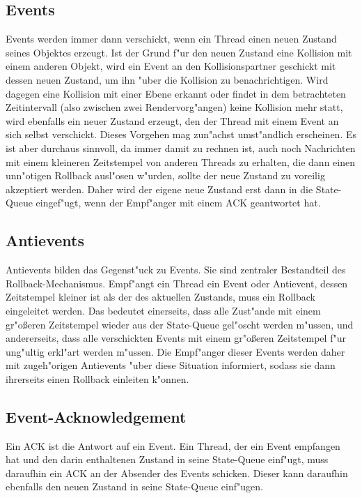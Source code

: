 \documentclass[a4paper, 10pt, openright, parskip, chapterprefix]{scrreprt}
\begin{document}
\subsection{Events}
Events werden immer dann verschickt, wenn ein Thread einen neuen Zustand seines Objektes erzeugt. Ist der Grund f"ur den
neuen Zustand eine Kollision mit einem anderen Objekt, wird ein Event an den Kollisionspartner geschickt mit dessen
neuen Zustand, um ihn "uber
die Kollision zu benachrichtigen. Wird dagegen eine Kollision mit einer Ebene erkannt oder findet in dem betrachteten
Zeitintervall (also zwischen zwei Rendervorg"angen) keine Kollision mehr statt, wird ebenfalls ein neuer Zustand
erzeugt, den der Thread mit einem Event an sich selbst verschickt. Dieses Vorgehen mag zun"achst umst"andlich erscheinen. Es ist aber
durchaus sinnvoll, da immer damit zu rechnen ist, auch noch Nachrichten mit einem kleineren Zeitstempel von anderen
Threads zu erhalten, die dann einen unn"otigen Rollback ausl"osen w"urden, sollte der neue Zustand zu voreilig akzeptiert
werden. Daher wird der eigene neue Zustand erst dann in die State-Queue eingef"ugt, wenn der Empf"anger mit einem ACK
geantwortet hat.

\subsection{Antievents}
Antievents bilden das Gegenst"uck zu Events. Sie sind zentraler Bestandteil des Rollback-Mechanismus. Empf"angt ein
Thread ein Event oder Antievent, dessen Zeitstempel kleiner ist als der des aktuellen Zustands, muss ein Rollback eingeleitet
werden. Das bedeutet einerseits, dass alle Zust"ande mit einem gr"o\ss eren Zeitstempel wieder aus der State-Queue gel"oscht werden m"ussen, und
andererseits, dass alle verschickten Events mit einem gr"o\ss eren Zeitstempel f"ur ung"ultig erkl"art werden m"ussen.
Die Empf"anger dieser Events werden daher mit
zugeh"origen Antievents "uber diese Situation informiert, sodass sie dann ihrerseits einen Rollback einleiten k"onnen.

\subsection{Event-Acknowledgement}
Ein ACK ist die Antwort auf ein Event. Ein Thread, der ein Event empfangen hat und den darin enthaltenen Zustand in
seine State-Queue einf"ugt, muss daraufhin ein ACK an der Absender des Events schicken. Dieser kann daraufhin
ebenfalls den neuen Zustand in seine State-Queue einf"ugen.
\end{document}
